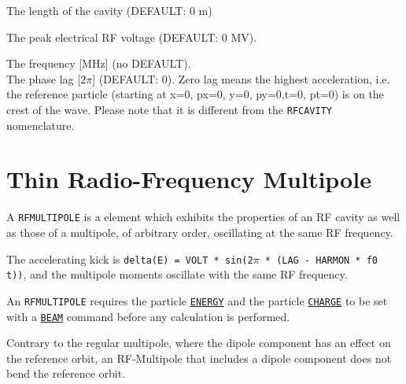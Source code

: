 \begin{madlist}
    The length of the cavity (DEFAULT: 0 m)

    The peak electrical RF voltage (DEFAULT: 0 MV).

    The frequency [MHz] (no DEFAULT).  \\[3mm]

    The phase lag [$2\pi$] (DEFAULT: 0). Zero lag means the highest acceleration,
                i.e. the reference particle (starting at x=0, px=0, y=0, py=0,t=0, pt=0)
                is on the crest of the wave. Please note that it is different from
                the \texttt{RFCAVITY} nomenclature.


\end{madlist}




\section{Thin Radio-Frequency Multipole}
\label{sec:rfmultipole}


A \texttt{RFMULTIPOLE} is a element which exhibits the properties
of an RF cavity as well as those of a multipole, of arbitrary order, oscillating at
the same RF frequency.

The accelerating kick is \texttt{delta(E) = VOLT * sin(2$\pi$ * (LAG - HARMON *
f0 t))}, and the multipole moments oscillate with the same RF frequency.

An \texttt{RFMULTIPOLE} requires the particle
\hyperref[sec:beam]{\texttt{ENERGY}} and the particle
\hyperref[sec:beam]{\texttt{CHARGE}} to be set with a
\hyperref[sec:beam]{\texttt{BEAM}} command before any calculation is
performed.

Contrary to the regular multipole, where the dipole
component has an effect on the reference orbit, an RF-Multipole that
includes a dipole component does not bend the reference orbit.

